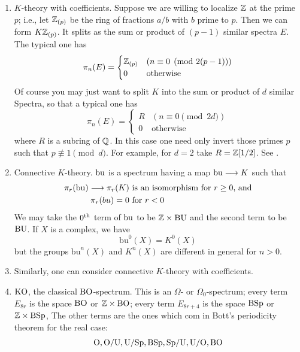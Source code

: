 \documentclass[../main]{subfiles}
\begin{document}
\begin{enumerate}[label = (\roman*)]
    The coefficient groups are given by the Bott periodicity theorem:
    \[\pi_n(K) =
    \begin{cases}
     \bZ &\text{(n is even)} \\
     0 &\text{(n is odd)}
    \end{cases}\]
    We have a map $K\simeq S\wedge K\vra{i\wedge 1} H\wedge K \lra H\left( \pi_\ast(K)\otimes \bQ \right)$. This map is universal Chern character.
    \item $K$-theory with coefficients. Suppose we are willing to localize $\mathbb{Z}$ at the prime $p$; i.e., let $\mathbb{Z}_{(p)}$ be the ring of fractions $a/b$ with $b$ prime to $p$. Then we can form $K\mathbb{Z}_{(p)}$. It splits as the sum or product of $(p-1)$ similar spectra $E$. The typical one has
    \[\pi_n(E)=
    \begin{cases}
    \mathbb{Z}_{(p)} &(n\equiv 0 \pmod{2(p-1)}) \\
    0 & \text{otherwise}
    \end{cases}\]
    Of course you may just want to split $K$ into the sum or product of $d$ similar Spectra, so that a typical one has
    \[\pi_n(E)=
    \begin{cases}
    R &(n\equiv 0 \pmod{2d}) \\
    0 & \text{otherwise}
    \end{cases}\]
    where $R$ is a subring of $\mathbb{Q}$. In this case one need only invert those primes $p$ such that $p\not\equiv 1 \pmod{d}$. For example, for $d=2$ take $R=\mathbb{Z}[1/2]$. See \cite{adams3}.
    \item Connective $K$-theory. $\mathrm{bu}$ is a spectrum having a map $\mathrm{bu}\longrightarrow K$ such that
    \begin{align}
        \pi_r(\mathrm{bu})\longrightarrow\pi_r(K) &\text{ is an isomorphism for }r\geq 0 \text{, and} \nonumber \\
        \pi_r(bu)=0 &\text{ for } r<0 \nonumber
    \end{align}
    We may take the $0^{\text{th}}$ term of $\mathrm{bu}$ to be $\mathbb{Z}\times \mathrm{BU}$ and the second term to be $\mathrm{BU}$. If $X$ is a complex, we have
    \[\mathrm{bu}^0(X)=K^0(X)\]
    but the groups $\mathrm{bu}^n(X)$ and $K^n(X)$ are different in general for $n>0$.
    \item Similarly, one can consider connective $K$-theory with coefficients.
    \item $\mathrm{KO}$, the classical $\mathrm{BO}$-spectrum. This is an $\Omega$- or $\Omega_0$-spectrum; every term $E_{8r}$ is the space $\mathrm{BO}$ or $\mathbb{Z}\times \mathrm{BO}$; every term $E_{8r+4}$ is the space $\mathrm{BSp}$ or $\mathbb{Z}\times \mathrm{BSp}$, The other terms are the ones which com in Bott's periodicity theorem for the real case:
    \[\mathrm{O, O/U, U/Sp, BSp}, \mathrm{Sp}/\mathrm{U, U/O, BO}\]
    

\end{enumerate}
\end{document}

